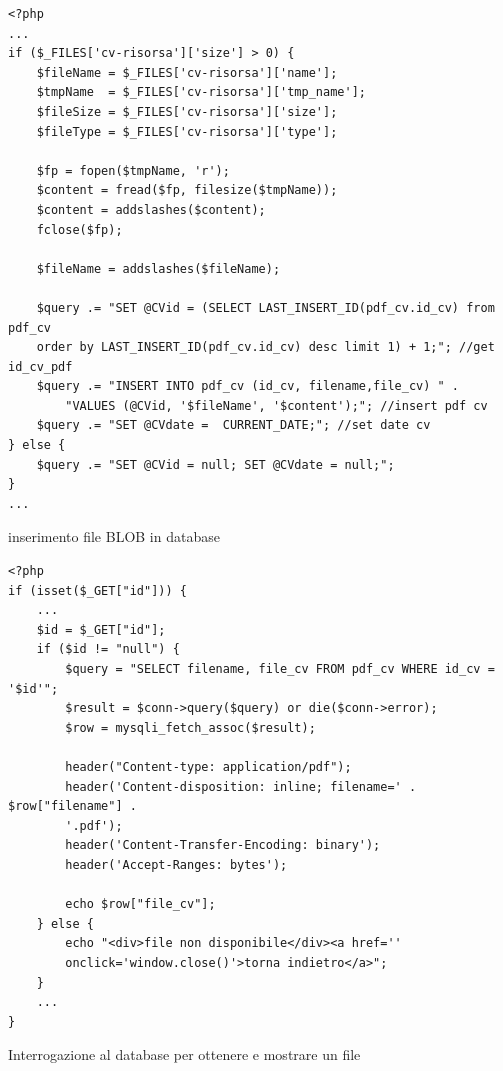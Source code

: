 \begin{listing}[!hbt]
\begin{verbatim}
<?php 
...
if ($_FILES['cv-risorsa']['size'] > 0) {
    $fileName = $_FILES['cv-risorsa']['name'];
    $tmpName  = $_FILES['cv-risorsa']['tmp_name'];
    $fileSize = $_FILES['cv-risorsa']['size'];
    $fileType = $_FILES['cv-risorsa']['type'];

    $fp = fopen($tmpName, 'r');
    $content = fread($fp, filesize($tmpName));
    $content = addslashes($content);
    fclose($fp);

    $fileName = addslashes($fileName);

    $query .= "SET @CVid = (SELECT LAST_INSERT_ID(pdf_cv.id_cv) from pdf_cv
    order by LAST_INSERT_ID(pdf_cv.id_cv) desc limit 1) + 1;"; //get id_cv_pdf
    $query .= "INSERT INTO pdf_cv (id_cv, filename,file_cv) " .
        "VALUES (@CVid, '$fileName', '$content');"; //insert pdf cv
    $query .= "SET @CVdate =  CURRENT_DATE;"; //set date cv
} else {
    $query .= "SET @CVid = null; SET @CVdate = null;";
}
...
\end{verbatim}
\caption{inserimento file BLOB in database}
\label{code:blob}
\end{listing}
\begin{listing}[!hbt]
\begin{verbatim}
<?php
if (isset($_GET["id"])) {
    ...
    $id = $_GET["id"];
    if ($id != "null") {
        $query = "SELECT filename, file_cv FROM pdf_cv WHERE id_cv = '$id'";
        $result = $conn->query($query) or die($conn->error);
        $row = mysqli_fetch_assoc($result);

        header("Content-type: application/pdf");
        header('Content-disposition: inline; filename=' . $row["filename"] .
        '.pdf');
        header('Content-Transfer-Encoding: binary');
        header('Accept-Ranges: bytes');
        
        echo $row["file_cv"];
    } else {
        echo "<div>file non disponibile</div><a href='' 
        onclick='window.close()'>torna indietro</a>";
    }
    ...
}
\end{verbatim}
\caption{Interrogazione al database per ottenere e mostrare un file}
\label{code:get_cv}
\end{listing}

